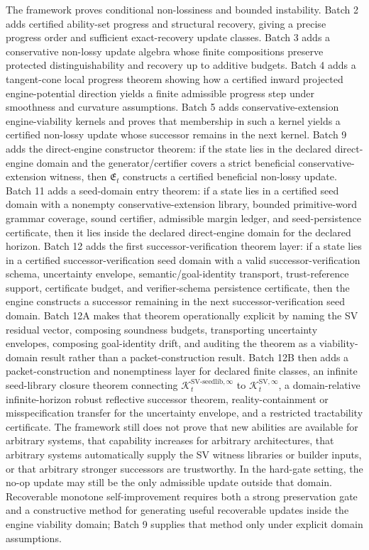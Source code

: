 \documentclass[11pt]{article}
\newcommand{\1}{\mathbf{1}}
\providecommand{\Kcal}{\mathcal{K}}
\begin{document}
The framework proves conditional non-lossiness and bounded instability. Batch 2 adds certified ability-set progress and structural recovery, giving a precise progress order and sufficient exact-recovery update classes. Batch 3 adds a conservative non-lossy update algebra whose finite compositions preserve protected distinguishability and recovery up to additive budgets. Batch 4 adds a tangent-cone local progress theorem showing how a certified inward projected engine-potential direction yields a finite admissible progress step under smoothness and curvature assumptions. Batch 5 adds conservative-extension engine-viability kernels and proves that membership in such a kernel yields a certified non-lossy update whose successor remains in the next kernel. Batch 9 adds the direct-engine constructor theorem: if the state lies in the declared direct-engine domain and the generator/certifier covers a strict beneficial conservative-extension witness, then \(\mathfrak E_t\) constructs a certified beneficial non-lossy update. Batch 11 adds a seed-domain entry theorem: if a state lies in a certified seed domain with a nonempty conservative-extension library, bounded primitive-word grammar coverage, sound certifier, admissible margin ledger, and seed-persistence certificate, then it lies inside the declared direct-engine domain for the declared horizon. Batch 12 adds the first successor-verification theorem layer: if a state lies in a certified successor-verification seed domain with a valid successor-verification schema, uncertainty envelope, semantic/goal-identity transport, trust-reference support, certificate budget, and verifier-schema persistence certificate, then the engine constructs a successor remaining in the next successor-verification seed domain. Batch 12A makes that theorem operationally explicit by naming the SV residual vector, composing soundness budgets, transporting uncertainty envelopes, composing goal-identity drift, and auditing the theorem as a viability-domain result rather than a packet-construction result. Batch 12B then adds a packet-construction and nonemptiness layer for declared finite classes, an infinite seed-library closure theorem connecting \(\Kcal_t^{\mathrm{SV\mbox{-}seedlib},\infty}\) to \(\Kcal_t^{\mathrm{SV},\infty}\), a domain-relative infinite-horizon robust reflective successor theorem, reality-containment or misspecification transfer for the uncertainty envelope, and a restricted tractability certificate. The framework still does not prove that new abilities are available for arbitrary systems, that capability increases for arbitrary architectures, that arbitrary systems automatically supply the SV witness libraries or builder inputs, or that arbitrary stronger successors are trustworthy. In the hard-gate setting, the no-op update may still be the only admissible update outside that domain. Recoverable monotone self-improvement requires both a strong preservation gate and a constructive method for generating useful recoverable updates inside the engine viability domain; Batch 9 supplies that method only under explicit domain assumptions.
\end{document}
